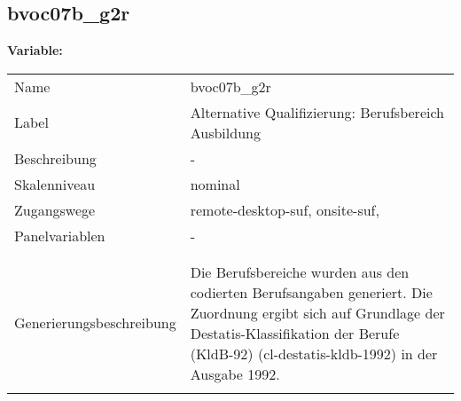 	
	
	\subsection{bvoc07b\_g2r}
	\label{subSection:bvoc07b_g2r}

	\noindent\textbf{Variable:}\\
		\begin{tabular}{lL{11.3cm}}
			\label{tableVariable:bvoc07b_g2r}
			Name & bvoc07b\_g2r \\
			Label & Alternative Qualifizierung: Berufsbereich Ausbildung \\
			Beschreibung & - \\
			Skalenniveau & nominal \\
			Zugangswege &
				remote-desktop-suf,
				onsite-suf,
 \\
			Panelvariablen & -
			 \\
			 \\
 \\
					Generierungsbeschreibung & Die Berufsbereiche wurden aus den codierten Berufsangaben generiert. Die Zuordnung ergibt sich auf Grundlage der Destatis-Klassifikation der Berufe (KldB-92) (cl-destatis-kldb-1992) in der Ausgabe 1992. 
				 \\	
			 \\
		\end{tabular}






